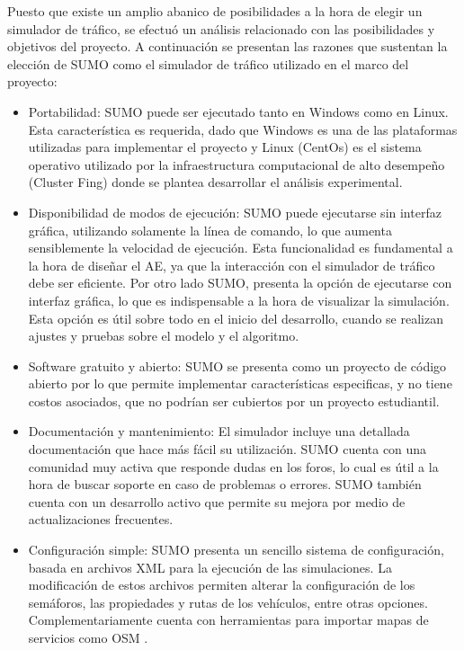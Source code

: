 Puesto que existe un amplio abanico de posibilidades a la hora de elegir un simulador de tráfico, se efectuó un análisis relacionado con las posibilidades y objetivos del proyecto. A continuación se presentan las razones que sustentan la elección de SUMO como el simulador de tráfico utilizado en el marco del proyecto:

\begin{itemize}
	\item Portabilidad: SUMO puede ser ejecutado tanto en Windows como en Linux. Esta característica es requerida, dado que Windows es una de las plataformas utilizadas para implementar el proyecto y Linux (CentOs) es el sistema operativo utilizado por la infraestructura computacional de alto desempeño (Cluster Fing) donde se plantea desarrollar el análisis experimental.
	
	\item Disponibilidad de modos de ejecución: SUMO puede ejecutarse sin interfaz gráfica, utilizando solamente la línea de comando, lo que aumenta sensiblemente la velocidad de ejecución. Esta funcionalidad es fundamental a la hora de diseñar el AE, ya que la interacción con el simulador de tráfico debe ser eficiente. Por otro lado SUMO, presenta la opción de ejecutarse con interfaz gráfica, lo que es indispensable a la hora de visualizar la simulación. Esta opción es útil sobre todo en el inicio del desarrollo, cuando se realizan ajustes y pruebas sobre el modelo y el algoritmo.
	
	\item Software gratuito y abierto: SUMO se presenta como un proyecto de código abierto por lo que permite implementar características especificas, y no tiene costos asociados, que no podrían ser cubiertos por un proyecto estudiantil. 
	
	\item Documentación y mantenimiento: El simulador incluye una detallada documentación que hace más fácil su utilización. SUMO cuenta con una comunidad muy activa que responde dudas en los foros, lo cual es útil a la hora de buscar soporte en caso de problemas o errores. SUMO también cuenta con un desarrollo activo que permite su mejora por medio de actualizaciones frecuentes.
	
	\item Configuración simple: SUMO presenta un sencillo sistema de configuración, basada en archivos XML para la ejecución de las simulaciones. La modificación de estos archivos permiten alterar la configuración de los semáforos, las propiedades y rutas de los vehículos, entre otras opciones. Complementariamente cuenta con herramientas para importar mapas de servicios como OSM \citep{OSM}.
	

\end{itemize}
